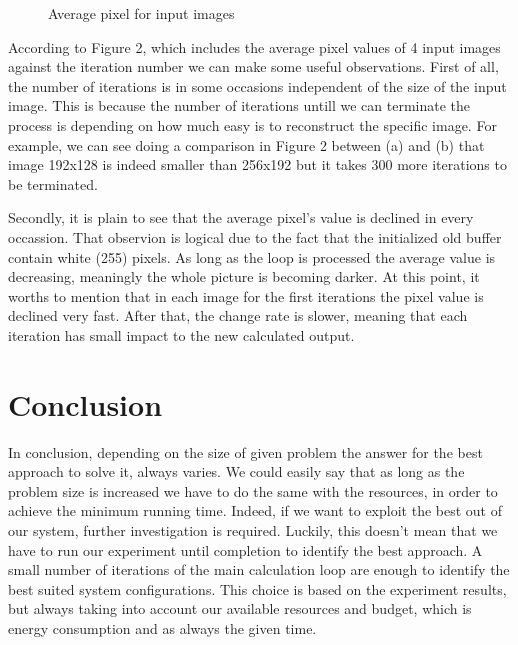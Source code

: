 \documentclass[12pt,a4paper]{article}
\newcommand{\sectionVspacing}{\vspace{15pt}}
\begin{document}
\begin{figure}[ht]
  			    \qquad
  			    \caption{Average pixel for input images}
  			    \label{average_pixel}
    			\end{figure}

            According to Figure 2, which includes the average pixel values of 4 input images against the iteration number we can make some useful observations. First of all, the number of iterations is in some occasions independent of the size of the input image. This is because the number of iterations untill we can terminate the process is depending on how much easy is to reconstruct the specific image. For example, we can see doing a comparison in Figure 2 between  (a) and (b) that image 192x128 is indeed smaller than 256x192 but it takes 300 more iterations to be terminated.

            Secondly, it is plain to see that the average pixel's value is declined in every occassion. That observion is logical due to the fact that the initialized old buffer contain white (255) pixels. As long as the loop is processed the average value is decreasing, meaningly the whole picture is becoming darker. At this point, it worths to mention that in each image for the first iterations the pixel value is declined very fast. After that, the change rate is slower, meaning that each iteration has small impact to the new calculated output.

\sectionVspacing

\section{Conclusion}
	In conclusion, depending on the size of given problem the answer for the best approach to solve it, always varies. We could easily say that as long as the problem size is increased we have to do the same with the resources, in order to achieve the minimum running time. Indeed, if we want to exploit the best out of our system, further investigation is required. Luckily, this doesn't mean that we have to run our experiment until completion to identify the best approach. A small number of iterations of the main calculation loop are enough to identify the best suited system configurations. This choice is based on the experiment results, but always taking into account our available resources and budget, which is energy consumption and as always the given time.
\end{document}
